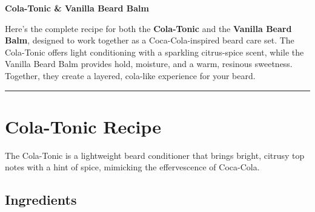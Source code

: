 \documentclass{article}
\begin{document}
\begin{center}
\LARGE\textbf{\textcolor{cola}{Cola-Tonic \& Vanilla Beard Balm}}
\end{center}

\vspace{1em}

Here's the complete recipe for both the \textbf{Cola-Tonic} and the \textbf{Vanilla Beard Balm}, designed to work together as a Coca-Cola-inspired beard care set. The Cola-Tonic offers light conditioning with a sparkling citrus-spice scent, while the Vanilla Beard Balm provides hold, moisture, and a warm, resinous sweetness. Together, they create a layered, cola-like experience for your beard.

\vspace{1em}
\hrule
\vspace{1em}

\section*{Cola-Tonic Recipe}

The Cola-Tonic is a lightweight beard conditioner that brings bright, citrusy top notes with a hint of spice, mimicking the effervescence of Coca-Cola.

\subsection*{Ingredients}
\end{document}
